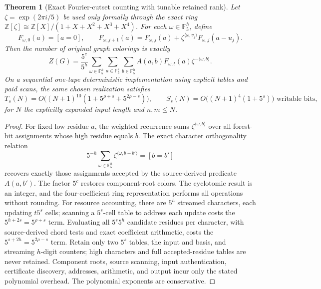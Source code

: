 \documentclass[11pt]{article}
\newtheorem{theorem}{Theorem}
\begin{document}
\begin{theorem}[Exact Fourier-cutset counting with tunable retained rank]
Let $\zeta=\exp(2\pi i/5)$ be used \emph{only formally} through the
exact ring $\mathbb Z[\zeta]\cong
\mathbb Z[X]/(1+X+X^2+X^3+X^4)$.
For each $\omega\in\mathbb F_5^h$, define
\[
F_{\omega,0}(a)=[a=0],\qquad
F_{\omega,j+1}(a)=F_{\omega,j}(a)+
\zeta^{\langle\omega,v_j\rangle}F_{\omega,j}(a-u_j).
\]
Then the number of original graph colorings is exactly
\[
Z(G)=\frac{5^c}{5^h}
\sum_{\omega\in\mathbb F_5^h}\sum_{a\in\mathbb F_5^s}
\sum_{b\in\mathbb F_5^h}
A(a,b)F_{\omega,t}(a)\zeta^{-\langle\omega,b\rangle}.
\]
On a sequential one-tape deterministic implementation using explicit
tables and paid scans, the \emph{same chosen realization} satisfies
\[
T_s(N)=O\bigl((N+1)^{10}(1+5^{\rho+s}+5^{2\rho-s})\bigr),
\qquad
S_s(N)=O\bigl((N+1)^4(1+5^s)\bigr)\text{ writable bits},
\]
for $N$ the explicitly expanded input length and $n,m\le N$.
\end{theorem}
\begin{proof}
For fixed low residue $a$, the weighted recurrence sums
$\zeta^{\langle\omega,b\rangle}$ over all forest-bit assignments
whose high residue equals $b$. The exact character orthogonality
relation
\[
5^{-h}\sum_{\omega\in\mathbb F_5^h}
\zeta^{\langle\omega,b-b'\rangle}=[b=b']
\]
recovers exactly those assignments accepted by the source-derived
predicate $A(a,b')$. The factor $5^c$ restores component-root
colors. The cyclotomic result is an integer, and the four-coefficient
ring representation performs all operations without rounding.
For resource accounting, there are $5^h$ streamed characters, each
updating $t5^s$ cells; scanning a $5^s$-cell table to address each
update costs the $5^{h+2s}=5^{\rho+s}$ term. Evaluating all
$5^s5^h$ candidate residues per character, with source-derived
chord tests and exact coefficient arithmetic, costs the
$5^{s+2h}=5^{2\rho-s}$ term. Retain only two $5^s$ tables, the
input and basis, and streaming $h$-digit counters; high characters
and full accepted-residue tables are never retained. Component
roots, source scanning, input authentication, certificate discovery,
addresses, arithmetic, and output incur only the stated polynomial
overhead. The polynomial exponents are conservative.
\end{proof}
\end{document}
